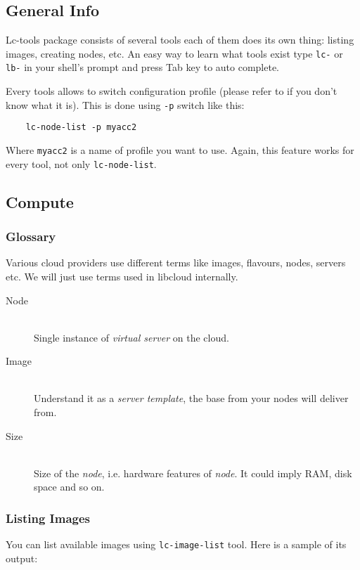 \documentclass[a4paper]{report}
\begin{document}
        \subsection{General Info}
	Lc-tools package consists of several tools each of them does its own thing:
	listing images, creating nodes, etc. An easy way to learn what tools exist
	type \texttt{lc-} or \texttt{lb-} in your shell's prompt and press
        Tab key to auto complete.

	Every tools allows to switch configuration profile (please refer
	to  if you don't know what it is). This is done using
	\texttt{-p} switch like this:

	\begin{verbatim}
	lc-node-list -p myacc2
	\end{verbatim}

	Where \texttt{myacc2} is a name of profile you want to use. Again, this
	feature works for every tool, not only \texttt{lc-node-list}.

         \subsection{Compute}
		 \subsubsection{Glossary}
		    Various cloud providers use different terms like images, flavours, nodes,
		    servers etc. We will just use terms used in libcloud internally.

		    \begin{description}
		       \item[Node] \hfill \\
		       Single instance of \textit{virtual server} on the cloud.
		       \item[Image] \hfill \\
		       Understand it as a \textit{server template}, the base from your nodes
		       will deliver from.
		       \item[Size] \hfill \\
		       Size of the \textit{node}, i.e. hardware features of \textit{node}.
		       It could imply RAM, disk space and so on.
		    \end{description}
		 \subsubsection{Listing Images}
		    You can list available images using \texttt{lc-image-list} tool. Here
		    is a sample of its output:
\end{document}
